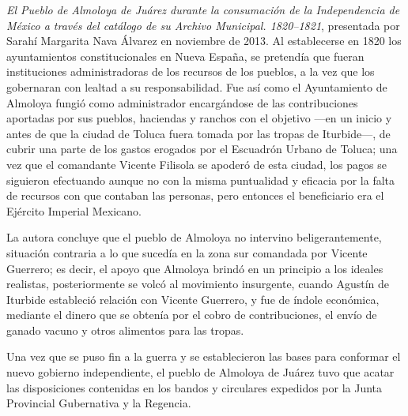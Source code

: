 \smallskip
\noindent \textsl{El Pueblo de Almoloya de Juárez durante 
la consumación de la Independencia de México a través del catálogo de 
su Archivo Municipal. 1820--1821}, presentada por Sarahí Margarita Nava 
Álvarez en noviembre de 2013. Al establecerse en 1820 los ayuntamientos 
constitucionales en Nueva España, se pretendía que fueran instituciones 
administradoras de los recursos de los pueblos,  a la vez que los 
gobernaran con lealtad a su responsabilidad. Fue así como el 
Ayuntamiento de Almoloya fungió como administrador encargándose de las 
contribuciones aportadas por sus pueblos, haciendas y ranchos con el 
objetivo ---en un inicio y antes de que la ciudad de Toluca fuera tomada 
por las tropas de Iturbide---, de cubrir una parte de los gastos erogados 
por el Escuadrón Urbano de Toluca; una vez que el comandante Vicente 
Filisola se apoderó de esta ciudad, los pagos se siguieron efectuando 
aunque no con la misma puntualidad y eficacia por la falta de recursos 
con que contaban las personas, pero entonces el beneficiario era el 
Ejército Imperial Mexicano.

La autora concluye que el pueblo de Almoloya no intervino 
beligerantemente, situación contraria a lo que sucedía en la zona sur 
comandada por Vicente Guerrero; es decir, el apoyo que Almoloya brindó en un 
principio a los ideales realistas, posteriormente se volcó al movimiento 
insurgente, cuando Agustín de Iturbide estableció relación con Vicente 
Guerrero, y fue de índole económica, mediante el dinero que se obtenía por 
el cobro de contribuciones, el envío de ganado vacuno y otros alimentos 
para las tropas.

Una vez que se puso fin a la guerra y se establecieron las bases para 
conformar el nuevo gobierno independiente, el pueblo de Almoloya de 
Juárez tuvo que acatar las disposiciones contenidas en los bandos y 
circulares expedidos por la Junta Provincial Gubernativa y la Regencia.

